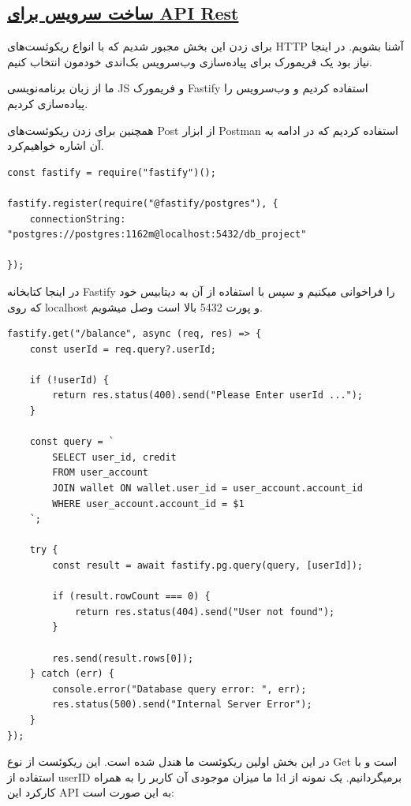\subsection*{\underline{ساخت سرویس برای API Rest}}

برای زدن این بخش مجبور شدیم که با انواع ریکوئست‌های HTTP آشنا بشویم. در اینجا نیاز بود یک فریمورک برای پیاده‌سازی وب‌سرویس بک‌اندی خودمون انتخاب کنیم.

ما از زبان برنامه‌نویسی JS و فریمورک Fastify استفاده کردیم و وب‌سرویس را پیاده‌سازی کردیم.

همچنین برای زدن ریکوئست‌های Post از ابزار Postman استفاده کردیم که در ادامه به آن اشاره خواهیم‌کرد.


\setLTR
\begin{lstlisting}
const fastify = require("fastify")();

fastify.register(require("@fastify/postgres"), {
    connectionString: "postgres://postgres:1162m@localhost:5432/db_project"

});
\end{lstlisting}
\setRTL
در اینجا کتابخانه Fastify را فراخوانی میکنیم و سپس با استفاده از آن به دیتابیس خود که روی localhost و پورت 5432 بالا است وصل میشویم.
\setLTR
\begin{lstlisting}    
fastify.get("/balance", async (req, res) => {
    const userId = req.query?.userId;

    if (!userId) {
        return res.status(400).send("Please Enter userId ...");
    }

    const query = `
        SELECT user_id, credit
        FROM user_account
        JOIN wallet ON wallet.user_id = user_account.account_id
        WHERE user_account.account_id = $1
    `;

    try {
        const result = await fastify.pg.query(query, [userId]);

        if (result.rowCount === 0) {
            return res.status(404).send("User not found");
        }

        res.send(result.rows[0]);
    } catch (err) {
        console.error("Database query error: ", err);
        res.status(500).send("Internal Server Error");
    }
});
\end{lstlisting}
\setRTL
در این بخش اولین ریکوئست ما هندل شده است. این ریکوئست از نوع Get است و با استفاده از userID ما میزان موجودی آن کاربر را به همراه Id برمیگردانیم. یک نمونه از کارکرد این API به این صورت است:

